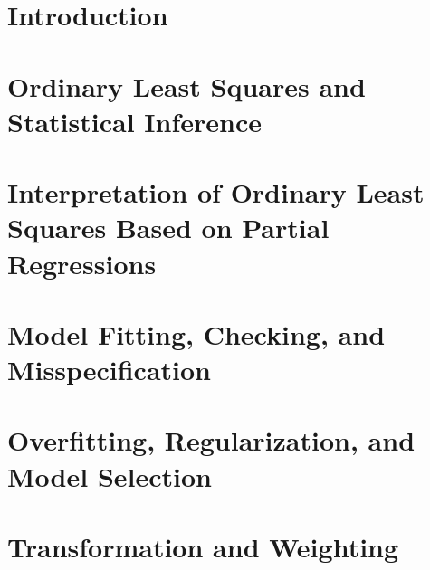 \documentclass[krantz2]{krantz}
\begin{document}
 

\part{Introduction}


 
  

 
  
\part{Ordinary Least Squares and Statistical Inference}

  
  
  
   
  
  
  \part{Interpretation of Ordinary Least Squares Based on Partial Regressions}\label{part::FWL-Cochran}
  
    
  
  


\part{Model Fitting, Checking, and Misspecification}
   
    
  
  
  
\part{Overfitting, Regularization, and Model Selection}\label{part::modelselection}
      
  



\part{Transformation and Weighting}
   
      
            
         
\end{document}
